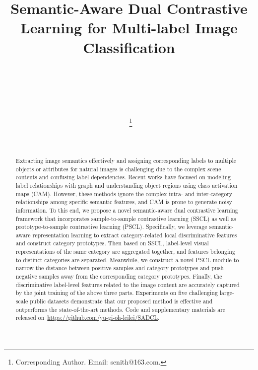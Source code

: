 \documentclass{ecai}
\begin{document}
\begin{frontmatter}

\title{Semantic-Aware Dual Contrastive Learning for Multi-label Image Classification}







\author[A,D]{~}
\author[B,D]{~}
\author[C]{~}
\author[A,D,E]{~\thanks{Corresponding Author. Email: senith@163.com.}}
\author[A,D]{~}



\address[A]{School of Computer Science and Technology, Anhui University, China}
\address[B]{School of Artificial Intelligence, Anhui University, China}
\address[C]{School of Computer Science and Engineering, Nanjing University of Science and Technology, China}
\address[D]{Anhui Provincial key Laboratory of Multimodal Cognitive Computing, Anhui University, China}
\address[E]{Institute of Artificial Intelligence, Hefei Comprehensive National Science Center, China}





\begin{abstract}
	Extracting image semantics effectively and assigning corresponding labels to multiple objects or attributes for natural images is challenging due to the complex scene contents and confusing label dependencies. Recent works have focused on modeling label relationships with graph and understanding object regions using class activation maps (CAM). However, these methods ignore the complex intra- and inter-category relationships among specific semantic features, and CAM is prone to generate noisy information. To this end, we propose a novel semantic-aware dual contrastive learning framework that incorporates sample-to-sample contrastive learning (SSCL) as well as prototype-to-sample contrastive learning (PSCL). Specifically, we leverage semantic-aware representation learning to extract category-related local discriminative features and construct category prototypes. Then based on SSCL, label-level visual representations of the same category are aggregated together, and features belonging to distinct categories are separated. Meanwhile, we construct a novel PSCL module to narrow the distance between positive samples and category prototypes and push negative samples away from the corresponding category prototypes. Finally, the discriminative label-level features related to the image content are accurately captured by the joint training of the above three parts. Experiments on five challenging large-scale public datasets demonstrate that our proposed method is effective and outperforms the state-of-the-art methods.  Code and supplementary materials are released on~\href{https://github.com/yu-gi-oh-leilei/SADCL}{https://github.com/yu-gi-oh-leilei/SADCL}.
\end{abstract}

\end{frontmatter}
\end{document}
